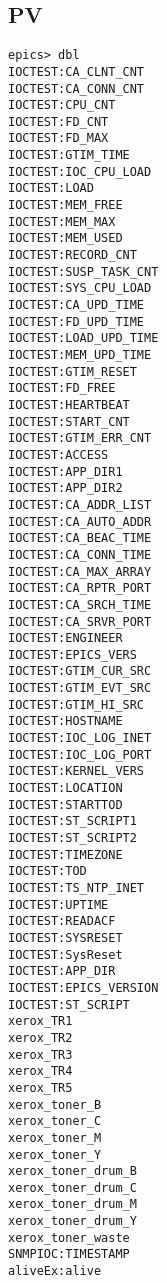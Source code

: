 \documentclass[11pt
  , a4paper
  , article
  , oneside
]{memoir}
\begin{document}
\subsection{PV}
\begin{lstlisting}[style=termstyle]
epics> dbl
IOCTEST:CA_CLNT_CNT
IOCTEST:CA_CONN_CNT
IOCTEST:CPU_CNT
IOCTEST:FD_CNT
IOCTEST:FD_MAX
IOCTEST:GTIM_TIME
IOCTEST:IOC_CPU_LOAD
IOCTEST:LOAD
IOCTEST:MEM_FREE
IOCTEST:MEM_MAX
IOCTEST:MEM_USED
IOCTEST:RECORD_CNT
IOCTEST:SUSP_TASK_CNT
IOCTEST:SYS_CPU_LOAD
IOCTEST:CA_UPD_TIME
IOCTEST:FD_UPD_TIME
IOCTEST:LOAD_UPD_TIME
IOCTEST:MEM_UPD_TIME
IOCTEST:GTIM_RESET
IOCTEST:FD_FREE
IOCTEST:HEARTBEAT
IOCTEST:START_CNT
IOCTEST:GTIM_ERR_CNT
IOCTEST:ACCESS
IOCTEST:APP_DIR1
IOCTEST:APP_DIR2
IOCTEST:CA_ADDR_LIST
IOCTEST:CA_AUTO_ADDR
IOCTEST:CA_BEAC_TIME
IOCTEST:CA_CONN_TIME
IOCTEST:CA_MAX_ARRAY
IOCTEST:CA_RPTR_PORT
IOCTEST:CA_SRCH_TIME
IOCTEST:CA_SRVR_PORT
IOCTEST:ENGINEER
IOCTEST:EPICS_VERS
IOCTEST:GTIM_CUR_SRC
IOCTEST:GTIM_EVT_SRC
IOCTEST:GTIM_HI_SRC
IOCTEST:HOSTNAME
IOCTEST:IOC_LOG_INET
IOCTEST:IOC_LOG_PORT
IOCTEST:KERNEL_VERS
IOCTEST:LOCATION
IOCTEST:STARTTOD
IOCTEST:ST_SCRIPT1
IOCTEST:ST_SCRIPT2
IOCTEST:TIMEZONE
IOCTEST:TOD
IOCTEST:TS_NTP_INET
IOCTEST:UPTIME
IOCTEST:READACF
IOCTEST:SYSRESET
IOCTEST:SysReset
IOCTEST:APP_DIR
IOCTEST:EPICS_VERSION
IOCTEST:ST_SCRIPT
xerox_TR1
xerox_TR2
xerox_TR3
xerox_TR4
xerox_TR5
xerox_toner_B
xerox_toner_C
xerox_toner_M
xerox_toner_Y
xerox_toner_drum_B
xerox_toner_drum_C
xerox_toner_drum_M
xerox_toner_drum_Y
xerox_toner_waste
SNMPIOC:TIMESTAMP
aliveEx:alive
\end{lstlisting}
\end{document}
